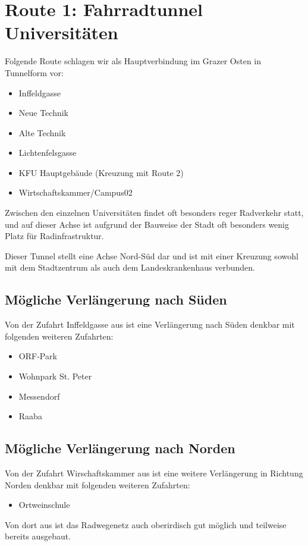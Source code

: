 \section{Route 1: Fahrradtunnel Universitäten}
Folgende Route schlagen wir als Hauptverbindung im Grazer Osten in Tunnelform vor:

\begin{itemize}
    \item Inffeldgasse
    \item Neue Technik
    \item Alte Technik
    \item Lichtenfelsgasse
    \item KFU Hauptgebäude (Kreuzung mit Route 2)
    \item Wirtschaftskammer/Campus02
\end{itemize}

Zwischen den einzelnen Universitäten findet oft besonders reger Radverkehr statt, und auf dieser Achse ist aufgrund der Bauweise der Stadt oft besonders wenig Platz für Radinfrastruktur.

Dieser Tunnel stellt eine Achse Nord-Süd dar und ist mit einer Kreuzung sowohl mit dem Stadtzentrum als auch dem Landeskrankenhaus verbunden.

\subsection{Mögliche Verlängerung nach Süden}
Von der Zufahrt Inffeldgasse aus ist eine Verlängerung nach Süden denkbar mit folgenden weiteren Zufahrten:
\begin{itemize}
    \item ORF-Park
    \item Wohnpark St. Peter
    \item Messendorf
    \item Raaba
\end{itemize}

\subsection{Mögliche Verlängerung nach Norden}
Von der Zufahrt Wirschaftskammer aus ist eine weitere Verlängerung in Richtung Norden denkbar mit folgenden weiteren Zufahrten:
\begin{itemize}
    \item Ortweinschule
\end{itemize}

Von dort aus ist das Radwegenetz auch oberirdisch gut möglich und teilweise bereits ausgebaut.